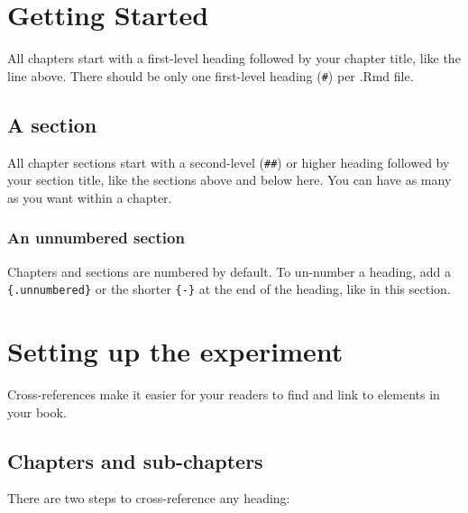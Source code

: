 \documentclass[
]{book}
\theoremstyle{definition}
\theoremstyle{definition}
\theoremstyle{definition}
\theoremstyle{definition}
\theoremstyle{remark}
\begin{document}
\hypertarget{getting-started}{%
\chapter{Getting Started}\label{getting-started}}

All chapters start with a first-level heading followed by your chapter title, like the line above. There should be only one first-level heading (\texttt{\#}) per .Rmd file.

\hypertarget{a-section}{%
\section{A section}\label{a-section}}

All chapter sections start with a second-level (\texttt{\#\#}) or higher heading followed by your section title, like the sections above and below here. You can have as many as you want within a chapter.

\hypertarget{an-unnumbered-section}{%
\subsection*{An unnumbered section}\label{an-unnumbered-section}}

Chapters and sections are numbered by default. To un-number a heading, add a \texttt{\{.unnumbered\}} or the shorter \texttt{\{-\}} at the end of the heading, like in this section.

\hypertarget{setting-up-the-experiment}{%
\chapter{Setting up the experiment}\label{setting-up-the-experiment}}

Cross-references make it easier for your readers to find and link to elements in your book.

\hypertarget{chapters-and-sub-chapters}{%
\section{Chapters and sub-chapters}\label{chapters-and-sub-chapters}}

There are two steps to cross-reference any heading:
\end{document}
